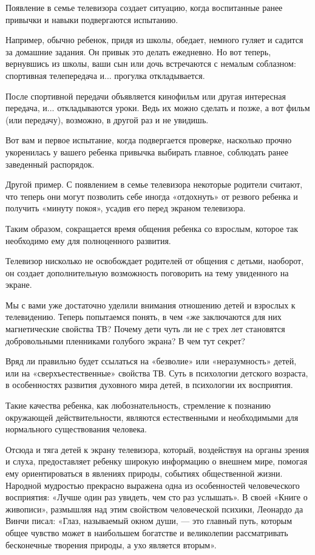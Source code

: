 \documentclass[12pt, a4paper, openany]{book}
\begin{document}
Появление в семье телевизора создает ситуацию, когда воспитанные ранее привычки и навыки подвергаются испытанию. 

Например, обычно ребенок, придя из школы, обедает, немного гуляет и садится за домашние задания. Он привык это делать ежедневно. Но вот теперь, вернувшись из школы, ваши сын или дочь встречаются с немалым соблазном: спортивная телепередача и... прогулка откладывается. 

После спортивной передачи объявляется кинофильм или другая интересная передача, и... откладываются уроки. Ведь их можно сделать и позже, а вот фильм (или передачу), возможно, в другой раз и не увидишь. 

Вот вам и первое испытание, когда подвергается проверке, насколько прочно укоренилась у вашего ребенка привычка выбирать главное, соблюдать ранее заведенный распорядок. 

Другой пример. С появлением в семье телевизора некоторые родители считают, что теперь они могут позволить себе иногда «отдохнуть» от резвого ребенка и получить «минуту покоя», усадив его перед экраном телевизора. 

Таким образом, сокращается время общения ребенка со взрослым, которое так необходимо ему для полноценного развития. 

Телевизор нисколько не освобождает родителей от общения с детьми, наоборот, он создает дополнительную возможность поговорить на тему увиденного на экране. 

Мы с вами уже достаточно уделили внимания отношению детей и взрослых к телевидению. Теперь попытаемся понять, в чем «же заключаются для них магнетические свойства ТВ? Почему дети чуть ли не с трех лет становятся добровольными пленниками голубого экрана? В чем тут секрет? 

Вряд ли правильно будет ссылаться на «безволие» или «неразумность» детей, или на «сверхъестественные» свойства ТВ. Суть в психологии детского возраста, в особенностях развития духовного мира детей, в психологии их восприятия. 

Такие качества ребенка, как любознательность, стремление к познанию окружающей действительности, являются естественными и необходимыми для нормального существования человека. 

Отсюда и тяга детей к экрану телевизора, который, воздействуя на органы зрения и слуха, предоставляет ребенку широкую информацию о внешнем мире, помогая ему ориентироваться в явлениях природы, событиях общественной жизни. Народной мудростью прекрасно выражена одна из особенностей человеческого восприятия: «Лучше один раз увидеть, чем сто раз услышать». В своей «Книге о живописи», размышляя над этим свойством человеческой психики, Леонардо да Винчи писал: «Глаз, называемый окном души, — это главный путь, которым общее чувство может в наибольшем богатстве и великолепии рассматривать бесконечные творения природы, а ухо является вторым». 
\end{document}
